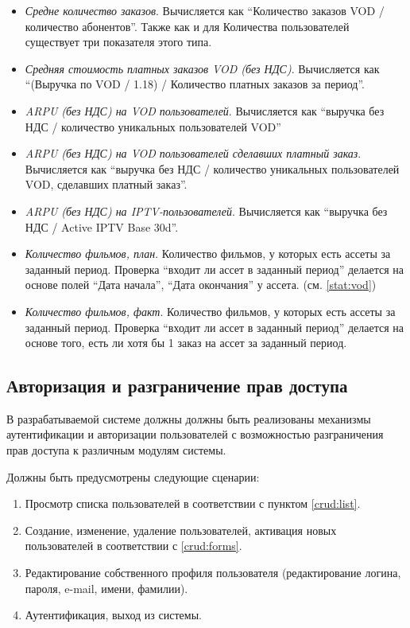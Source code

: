 \begin{itemize}
{}
\item{
\textit{Средне количество заказов}. Вычисляется как
``Количество заказов VOD /  количество абонентов''. Также как и для Количества пользователей существует три показателя этого типа.
}
\item{
\textit{Средняя стоимость платных заказов VOD (без НДС)}. Вычисляется как 
``(Выручка по VOD / 1.18) / Количество платных заказов за период''.
}
\item{
\textit{ARPU (без НДС) на VOD пользователей}. Вычисляется как ``выручка без НДС / количество уникальных пользователей VOD''
}
\item{
\textit{ARPU (без НДС) на VOD пользователей сделавших платный заказ}. 
Вычисляется как ``выручка без НДС / количество уникальных пользователей VOD, сделавших платный заказ''.
}
\item{
\textit{ARPU (без НДС) на IPTV-пользователей}. Вычисляется как ``выручка без НДС / Active IPTV Base 30d''.
}
\item{
\textit{Количество фильмов, план}.
Количество фильмов, у которых есть ассеты за заданный период.
Проверка “входит ли ассет в заданный период” делается на основе полей “Дата начала”, “Дата окончания” у ассета.
(см. \ref{stat:vod})
}
\item{
\textit{Количество фильмов, факт}.
Количество фильмов, у которых есть ассеты за заданный период.
Проверка “входит ли ассет в заданный период” делается на основе того, есть ли хотя бы 1 заказ на ассет за заданный период.
}
\end{itemize}

\subsection{Авторизация и разграничение прав доступа}
В разрабатываемой системе должны должны быть реализованы механизмы аутентификации и авторизации пользователей
с возможностью разграничения прав доступа к различным модулям системы.

Должны быть предусмотрены следующие сценарии:
\begin{enumerate}
\item{
Просмотр списка пользователей в соответствии с пунктом \ref{crud:list}.
}
\item{
Создание, изменение, удаление пользователей, активация новых пользователей в соответствии с \ref{crud:forms}.
}
\item{
Редактирование собственного профиля пользователя (редактирование логина, пароля, e-mail, имени, фамилии).
}
\item{
Аутентификация, выход из системы.
}
\end{enumerate}

